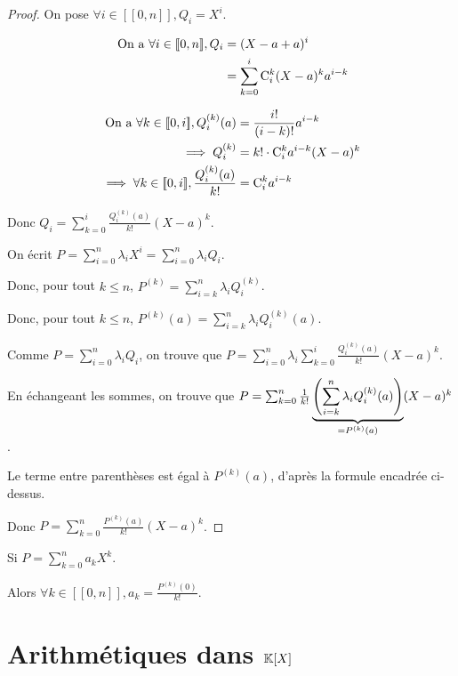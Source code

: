 \documentclass[12pt, a4paper]{report}
\begin{document}
\begin{proof}
    On pose $\forall i \in [\![0,n]\!], Q_i = X^i$.

    \begin{align*}
        \text{ On a } \forall i \in [\![0,n]\!], Q_i &= (X-a+a)^i\\
        &= \sum_{k=0}^{i} \mathrm{C}_{i}^{k} (X-a)^k a^{i-k}
    \end{align*}

    \begin{align*}
        \text{ On a } \forall k \in [\![0,i]\!], Q_i^{(k)}(a) &= \frac{i!}{(i-k)!} a^{i-k}\\
        \implies Q_i^{(k)} &= k! \cdot \mathrm{C}_{i}^{k} a^{i-k} (X-a)^k\\
        \implies \forall k \in [\![0,i]\!], \frac{Q_i^{(k)}(a)}{k!} &= \mathrm{C}_{i}^{k} a^{i-k}\\
    \end{align*}

    Donc $Q_i = \sum_{k=0}^{i} \frac{Q_i^{(k)}(a)}{k!} (X-a)^k$.

    On écrit $P = \sum_{i=0}^{n} \lambda_i X^i = \sum_{i=0}^{n} \lambda_i Q_i$.

    Donc, pour tout $k\le n$, $P^{(k)} = \sum_{i=k}^n \lambda_i Q_i^{(k)}$.

    Donc, pour tout $k \le n$, $\boxed{P^{(k)}(a) = \sum_{i=k}^n \lambda_i Q_i^{(k)}(a)}$.
    
    Comme $P = \sum_{i=0}^{n}\lambda_i Q_i$, on trouve que $P = \sum_{i=0}^{n} \lambda_i \sum_{k=0}^{i} \frac{Q_i^{(k)}(a)}{k!} (X-a)^k$.

    En échangeant les sommes, on trouve que $P = \sum_{k=0}^{n} \frac{1}{k!} \underbrace{\left(\sum_{i=k}^{n} \lambda_i Q_i^{(k)}(a)\right)}_{=P^{(k)}(a)} (X-a)^k$.

    Le terme entre parenthèses est égal à $P^{(k)}(a)$, d'après la formule encadrée ci-dessus.

    Donc $P = \sum_{k=0}^{n} \frac{P^{(k)}(a)}{k!} (X-a)^k$.

\end{proof}

\begin{remark}
    Si $P = \sum_{k=0}^{n}a_k X^k$.

    Alors $\forall k \in [\![0,n]\!], a_k = \frac{P^{(k)}(0)}{k!}$.
\end{remark}

\chapter{Arithmétiques dans $\mathbb{K}[X]$}
\end{document}
